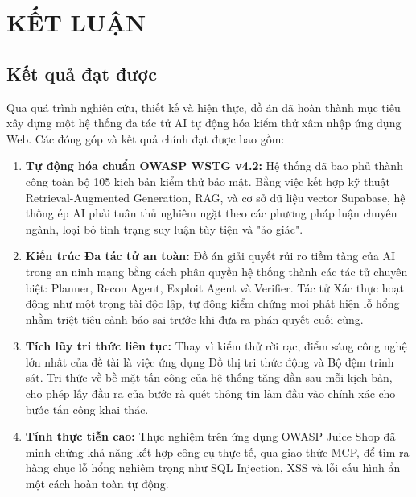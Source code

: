 \chapter*{\centering\Large{KẾT LUẬN}}

\section*{Kết quả đạt được}
Qua quá trình nghiên cứu, thiết kế và hiện thực, đồ án đã hoàn thành mục tiêu xây dựng một hệ thống đa tác tử AI tự động hóa kiểm thử xâm nhập ứng dụng Web. Các đóng góp và kết quả chính đạt được bao gồm:
\begin{enumerate}
    \item \textbf{Tự động hóa chuẩn OWASP WSTG v4.2:} Hệ thống đã bao phủ thành công toàn bộ 105 kịch bản kiểm thử bảo mật. Bằng việc kết hợp kỹ thuật Retrieval-Augmented Generation, RAG, và cơ sở dữ liệu vector Supabase, hệ thống ép AI phải tuân thủ nghiêm ngặt theo các phương pháp luận chuyên ngành, loại bỏ tình trạng suy luận tùy tiện và "ảo giác".
    \item \textbf{Kiến trúc Đa tác tử an toàn:} Đồ án giải quyết rủi ro tiềm tàng của AI trong an ninh mạng bằng cách phân quyền hệ thống thành các tác tử chuyên biệt: Planner, Recon Agent, Exploit Agent và Verifier. Tác tử Xác thực hoạt động như một trọng tài độc lập, tự động kiểm chứng mọi phát hiện lỗ hổng nhằm triệt tiêu cảnh báo sai trước khi đưa ra phán quyết cuối cùng.
    \item \textbf{Tích lũy tri thức liên tục:} Thay vì kiểm thử rời rạc, điểm sáng công nghệ lớn nhất của đề tài là việc ứng dụng Đồ thị tri thức động và Bộ đệm trinh sát. Tri thức về bề mặt tấn công của hệ thống tăng dần sau mỗi kịch bản, cho phép lấy đầu ra của bước rà quét thông tin làm đầu vào chính xác cho bước tấn công khai thác.
    \item \textbf{Tính thực tiễn cao:} Thực nghiệm trên ứng dụng OWASP Juice Shop đã minh chứng khả năng kết hợp công cụ thực tế, qua giao thức MCP, để tìm ra hàng chục lỗ hổng nghiêm trọng như SQL Injection, XSS và lỗi cấu hình ẩn một cách hoàn toàn tự động.
\end{enumerate}

